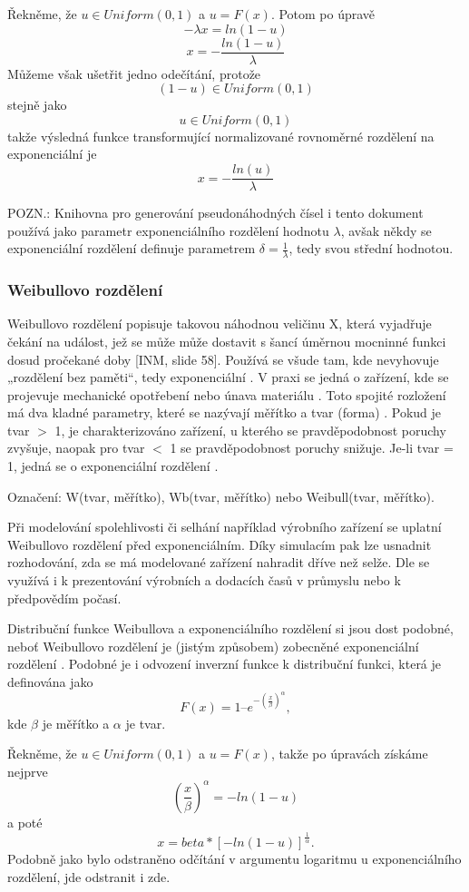 \documentclass[a4paper,11pt]{article}
\begin{document}
Řekněme, že $u \in Uniform(0,1)$ a $u = F(x)$. Potom po úpravě 
$$-\lambda x = ln(1-u)$$
$$x = -\frac {ln(1-u)}{\lambda}$$
Můžeme však ušetřit jedno odečítání, protože $$(1-u) \in Uniform(0,1)$$ stejně jako $$u \in Uniform(0,1)$$ takže výsledná funkce transformující normalizované rovnoměrné rozdělení na exponenciální je 
$$x = -\frac{ln(u)}{\lambda}$$

POZN.: Knihovna pro generování pseudonáhodných čísel i tento dokument používá jako parametr exponenciálního rozdělení hodnotu $\lambda$, avšak někdy se exponenciální rozdělení definuje parametrem $\delta = \frac{1}{\lambda}$, tedy svou střední hodnotou.

\subsubsection{Weibullovo rozdělení}

Weibullovo rozdělení popisuje takovou náhodnou veličinu X, která vyjadřuje čekání na událost, jež se může může dostavit s šancí úměrnou mocninné funkci dosud pročekané doby [INM, slide 58]. Používá se všude tam, kde nevyhovuje „rozdělení bez paměti“, tedy exponenciální \cite{IASTAT} \cite{HOMEN}. V praxi se jedná o zařízení, kde se projevuje mechanické opotřebení nebo únava materiálu \cite{HOMEN}. Toto spojité rozložení má dva kladné parametry, které se nazývají měřítko a tvar (forma) \cite{Toupal} \cite{INM}. Pokud je tvar $>$ 1, je charakterizováno zařízení, u kterého se pravděpodobnost poruchy zvyšuje, naopak pro tvar $<$ 1 se pravděpodobnost poruchy snižuje. Je-li tvar = 1, jedná se o exponenciální rozdělení \cite{Toupal}.

Označení: W(tvar, měřítko), Wb(tvar, měřítko) nebo Weibull(tvar, měřítko).

Při modelování spolehlivosti či selhání například výrobního zařízení se uplatní Weibullovo rozdělení před exponenciálním. Díky simulacím pak lze usnadnit rozhodování, zda se má modelované zařízení nahradit dříve než selže. Dle \cite{Toupal} se využívá i k prezentování výrobních a dodacích časů v průmyslu nebo k předpovědím počasí.

Distribuční funkce Weibullova a exponenciálního rozdělení si jsou dost podobné, neboť Weibullovo rozdělení je (jistým způsobem) zobecněné exponenciální rozdělení \cite{NR}. Podobné je i odvození inverzní funkce k distribuční funkci, která je definována jako $$F(x) = 1 – e^{-(\frac{x}{\beta})^{\alpha}},$$ kde $\beta$ je měřítko a $\alpha$ je tvar. 

Řekněme, že $u \in Uniform(0,1)$ a $u = F(x)$, takže po úpravách získáme nejprve 
$$\left(\frac{x}{\beta}\right)^\alpha = -ln(1-u)$$ 
a poté 
$$x = beta * [-ln(1-u)]^{\frac{1}{\alpha}}.$$ 
Podobně jako bylo odstraněno odčítání v argumentu logaritmu u exponenciálního rozdělení, jde odstranit i zde.
\end{document}
